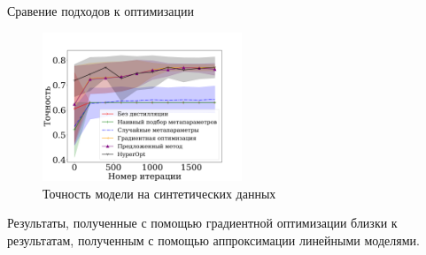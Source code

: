 \documentclass[12pt, aspectratio=169]{beamer}
\begin{document}

\begin{frame}{Сравение подходов к оптимизации}
\begin{figure}
    \caption*{Точность модели на синтетических данных}
    \vspace{-1 cm}
    \includegraphics[width=0.53\textwidth]{synth_accuracy_rus.pdf}
\end{figure}
Результаты, полученные с помощью градиентной оптимизации близки к результатам, полученным с помощью аппроксимации линейными моделями.
\end{frame}
\end{document}
